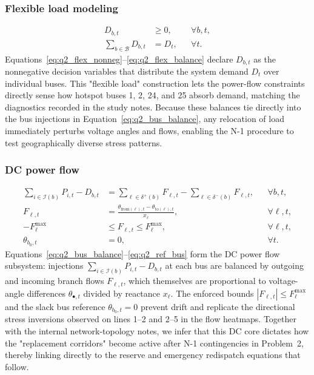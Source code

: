 \documentclass{apmcmthesis}
\begin{document}
\subsubsection{Flexible load modeling}
\begin{align}
    D_{b,t} &\ge 0, && \forall b,t, \label{eq:q2_flex_nonneg} \\
    \sum_{b\in\mathcal{B}} D_{b,t} &= D_t, && \forall t. \label{eq:q2_flex_balance}
\end{align}
\noindent Equations~\eqref{eq:q2_flex_nonneg}--\eqref{eq:q2_flex_balance} declare $D_{b,t}$ as the nonnegative decision variables that distribute the system demand $D_t$ over individual buses.
This "flexible load" construction lets the power-flow constraints directly sense how hotspot buses 1, 2, 24, and 25 absorb demand, matching the diagnostics recorded in the study notes.
Because these balances tie directly into the bus injections in Equation~\eqref{eq:q2_bus_balance}, any relocation of load immediately perturbs voltage angles and flows, enabling the N-1 procedure to test geographically diverse stress patterns.

\subsubsection{DC power flow}
\begin{align}
    \sum_{i\in\mathcal{I}(b)} P_{i,t} - D_{b,t} &= \sum_{\ell\in\delta^+(b)} F_{\ell,t} - \sum_{\ell\in\delta^-(b)} F_{\ell,t}, && \forall b,t, \label{eq:q2_bus_balance} \\
    F_{\ell,t} &= \frac{\theta_{\text{from}(\ell),t} - \theta_{\text{to}(\ell),t}}{x_\ell}, && \forall \ell,t, \label{eq:q2_dc_flow} \\
    -F_\ell^{\max} &\le F_{\ell,t} \le F_\ell^{\max}, && \forall \ell,t, \label{eq:q2_flow_limit} \\
    \theta_{b_0,t} &= 0, && \forall t. \label{eq:q2_ref_bus}
\end{align}
\noindent Equations~\eqref{eq:q2_bus_balance}--\eqref{eq:q2_ref_bus} form the DC power flow subsystem: injections $\sum_{i\in\mathcal{I}(b)} P_{i,t} - D_{b,t}$ at each bus are balanced by outgoing and incoming branch flows $F_{\ell,t}$, which themselves are proportional to voltage-angle differences $\theta_{\bullet,t}$ divided by reactance $x_\ell$.
The enforced bounds $|F_{\ell,t}| \le F_\ell^{\max}$ and the slack bus reference $\theta_{b_0,t}=0$ prevent drift and replicate the directional stress inversions observed on lines 1--2 and 2--5 in the flow heatmaps.
Together with the internal network-topology notes, we infer that this DC core dictates how the "replacement corridors" become active after N-1 contingencies in Problem~2, thereby linking directly to the reserve and emergency redispatch equations that follow.
\end{document}

